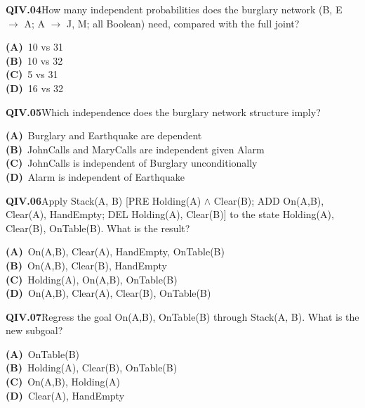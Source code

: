 \documentclass[11pt]{article}
\begin{document}
\begin{tcolorbox}[enhanced,breakable,colback=white,colframe=navyL,arc=2mm,boxrule=0.7pt,left=3mm,right=3mm,top=2mm,bottom=2mm]
\textbf{\color{navy}QIV.04}\quad How many independent probabilities does the burglary network (B, E $\to$ A; A $\to$ J, M; all Boolean) need, compared with the full joint?\hfill{}\par\smallskip
{\small \textbf{\color{navyL}(A)}\ 10 vs 31\\[1pt]\textbf{\color{navyL}(B)}\ 10 vs 32\\[1pt]\textbf{\color{navyL}(C)}\ 5 vs 31\\[1pt]\textbf{\color{navyL}(D)}\ 16 vs 32}
\end{tcolorbox}
\begin{tcolorbox}[enhanced,breakable,colback=white,colframe=navyL,arc=2mm,boxrule=0.7pt,left=3mm,right=3mm,top=2mm,bottom=2mm]
\textbf{\color{navy}QIV.05}\quad Which independence does the burglary network structure imply?\hfill{}\par\smallskip
{\small \textbf{\color{navyL}(A)}\ Burglary and Earthquake are dependent\\[1pt]\textbf{\color{navyL}(B)}\ JohnCalls and MaryCalls are independent given Alarm\\[1pt]\textbf{\color{navyL}(C)}\ JohnCalls is independent of Burglary unconditionally\\[1pt]\textbf{\color{navyL}(D)}\ Alarm is independent of Earthquake}
\end{tcolorbox}
\begin{tcolorbox}[enhanced,breakable,colback=white,colframe=navyL,arc=2mm,boxrule=0.7pt,left=3mm,right=3mm,top=2mm,bottom=2mm]
\textbf{\color{navy}QIV.06}\quad Apply Stack(A, B) [PRE Holding(A) $\wedge$ Clear(B); ADD On(A,B), Clear(A), HandEmpty; DEL Holding(A), Clear(B)] to the state {Holding(A), Clear(B), OnTable(B)}. What is the result?\hfill{}\par\smallskip
{\small \textbf{\color{navyL}(A)}\ {On(A,B), Clear(A), HandEmpty, OnTable(B)}\\[1pt]\textbf{\color{navyL}(B)}\ {On(A,B), Clear(B), HandEmpty}\\[1pt]\textbf{\color{navyL}(C)}\ {Holding(A), On(A,B), OnTable(B)}\\[1pt]\textbf{\color{navyL}(D)}\ {On(A,B), Clear(A), Clear(B), OnTable(B)}}
\end{tcolorbox}
\begin{tcolorbox}[enhanced,breakable,colback=white,colframe=navyL,arc=2mm,boxrule=0.7pt,left=3mm,right=3mm,top=2mm,bottom=2mm]
\textbf{\color{navy}QIV.07}\quad Regress the goal {On(A,B), OnTable(B)} through Stack(A, B). What is the new subgoal?\hfill{}\par\smallskip
{\small \textbf{\color{navyL}(A)}\ {OnTable(B)}\\[1pt]\textbf{\color{navyL}(B)}\ {Holding(A), Clear(B), OnTable(B)}\\[1pt]\textbf{\color{navyL}(C)}\ {On(A,B), Holding(A)}\\[1pt]\textbf{\color{navyL}(D)}\ {Clear(A), HandEmpty}}
\end{tcolorbox}
\end{document}
